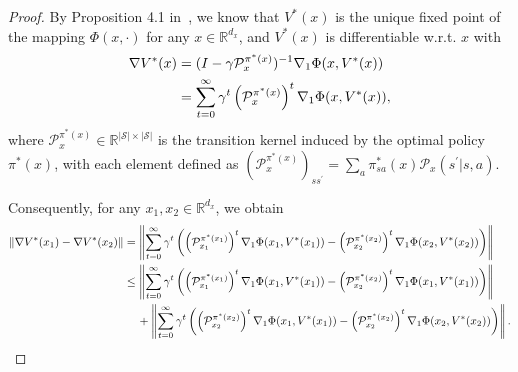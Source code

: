 \documentclass{article}
\theoremstyle{plain}
\theoremstyle{definition}
\theoremstyle{remark}
\def\R{\mathbb R}
\def\cP{\mathcal P}
\def\cS{\mathcal S}
\begin{document}
\begin{proof}
    By Proposition 4.1 in~\citet{yang2025bilevel}, we know that $V^*(x)$ is the unique fixed point of the mapping $\Phi(x,\cdot)$ for any $x \in \R^{d_x}$, and $V^*(x)$ is differentiable w.r.t. $x$ with
    \begin{align}
        \nabla V^*(x)  &= (I - \gamma \cP^{\pi^*(x)}_x)^{-1} \nabla_1 \Phi(x,V^*(x)) \notag \\
        & = \sum_{t=0}^\infty \gamma^t  \left(\cP^{\pi^*(x)}_x\right)^t \nabla_1 \Phi(x,V^*(x)), 
    \end{align}
    where $\cP_x^{\pi^*(x)} \in \R^{|\cS| \times |\cS|}$ is the transition kernel induced by the optimal policy $\pi^*(x)$, with each element defined as $\left(\cP^{\pi^*(x)}_x\right)_{ss^\prime} = \sum_a \pi^*_{sa}(x) \cP_x(s^\prime|s,a)$.

    Consequently, for any $x_1,x_2 \in \R^{d_x}$, we obtain
    \begin{align}
        \| \nabla V^*(x_1) - \nabla V^*(x_2) \| & = \left\| \sum_{t=0}^\infty \gamma^t \left(  \left(\cP^{\pi^*(x_1)}_{x_1}\right)^t \nabla_1 \Phi(x_1,V^*(x_1)) -  \left(\cP^{\pi^*(x_2)}_{x_2}\right)^t \nabla_1 \Phi(x_2,V^*(x_2))\right)\right\| \notag \\
        & \leq \left\|  \sum_{t=0}^\infty \gamma^t \left(  \left(\cP^{\pi^*(x_1)}_{x_1}\right)^t \nabla_1 \Phi(x_1,V^*(x_1)) -  \left(\cP^{\pi^*(x_2)}_{x_2}\right)^t \nabla_1 \Phi(x_1,V^*(x_1))\right) \right\| \notag \\
        & \quad \, + \left\|  \sum_{t=0}^\infty \gamma^t \left(  \left(\cP^{\pi^*(x_2)}_{x_2}\right)^t \nabla_1 \Phi(x_1,V^*(x_1)) -  \left(\cP^{\pi^*(x_2)}_{x_2}\right)^t \nabla_1 \Phi(x_2,V^*(x_2))\right) \right\| .\notag
    \end{align}


\end{proof}
\end{document}
